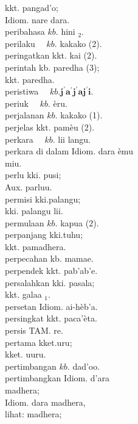 \documentclass[10pt]{article}
\begin{document}
kkt. pangad'o;\\
Idiom. nare dara.\\
peribahasa \(k b\). hini \(_{2}\).\\
perilaku \(\quad k b\). kakako (2).\\
peringatkan kkt. kai (2).\\
perintah kb. paredha (3);\\
kkt. paredha.\\
peristiwa \(\quad k b . \mathbf{j}^{\prime} \boldsymbol{a}^{\prime} \mathbf{j}^{\prime} \boldsymbol{a j}^{\prime} \mathbf{i}\).\\
periuk \(\quad k b\). èru.\\
perjalanan \(k b\). kakako (1).\\
perjelas kkt. pamèu (2).\\
perkara \(\quad k b\). lii langu.\\
perkara di dalam Idiom. dara èmu\\
miu.\\
perlu kki. pusi;\\
Aux. parluu.\\
permisi kki.palangu;\\
kki. palangu lii.\\
permulaan \(k b\). kapua (2).\\
perpanjang kki.tuhu;\\
kkt. pamadhera.\\
perpecahan kb. mamae.\\
perpendek kkt. pab'ab'e.\\
persalahkan kki. pasala;\\
kkt. galaa \({ }_{1}\).\\
persetan Idiom. ai-hèb'a.\\
persingkat kkt. paca'èta.\\
persis TAM. re.\\
pertama kket.uru;\\
kket. uuru.\\
pertimbangan \(k b\). dad'oo.\\
pertimbangkan Idiom. d'ara\\
madhera;\\
Idiom. dara madhera,\\
lihat: madhera;
\end{document}
